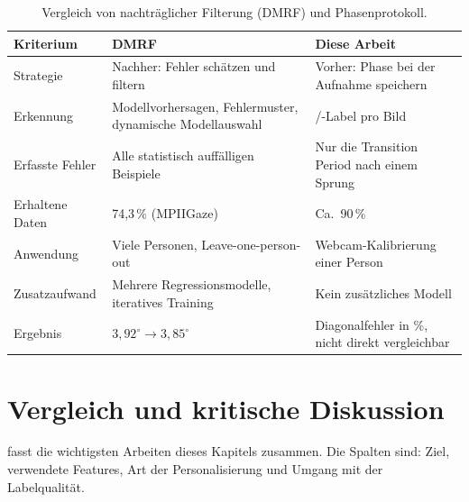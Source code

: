 \begin{table}[htbp]
  \centering
  \small
  \caption{Vergleich von nachträglicher Filterung (DMRF) und Phasenprotokoll.}
  \label{tab:dmrf_vergleich}
  \begin{tabularx}{\textwidth}{L{3.0cm} Y Y}
    \toprule
    \textbf{Kriterium} & \textbf{DMRF~\cite{jiang2026dmrf}} & \textbf{Diese Arbeit} \\
    \midrule
    Strategie & Nachher: Fehler schätzen und filtern & Vorher: Phase bei der Aufnahme speichern \\
    Erkennung & Modellvorhersagen, Fehlermuster, dynamische Modellauswahl & /-Label pro Bild \\
    Erfasste Fehler & Alle statistisch auffälligen Beispiele & Nur die Transition Period nach einem Sprung \\
    Erhaltene Daten & 74,3\,\% (MPIIGaze) & Ca.\ 90\,\% \\
    Anwendung & Viele Personen, Leave-one-person-out & Webcam-Kalibrierung einer Person \\
    Zusatzaufwand & Mehrere Regressionsmodelle, iteratives Training & Kein zusätzliches Modell \\
    Ergebnis & $3,92^\circ \rightarrow 3,85^\circ$ & Diagonalfehler in \%, nicht direkt vergleichbar \\
    \bottomrule
  \end{tabularx}
\end{table}

\section{Vergleich und kritische Diskussion}
\label{sec:vergleich}
 fasst die wichtigsten Arbeiten dieses Kapitels
zusammen. Die Spalten sind: Ziel, verwendete Features, Art der
Personalisierung und Umgang mit der Labelqualität.

